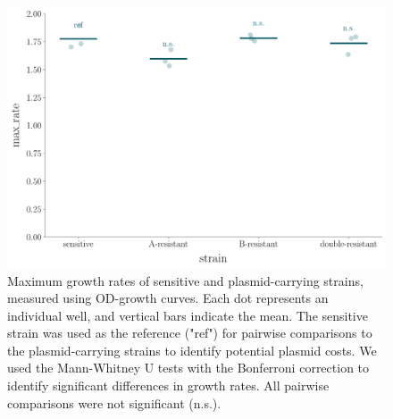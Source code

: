 \clearpage
\begin{figure}
    \centering
    \includegraphics[width=\linewidth]{supplementary_1/figures/plasmid_costs.pdf}
    \caption{
        Maximum growth rates of sensitive and plasmid-carrying strains, measured using OD-growth curves. 
        Each dot represents an individual well, and vertical bars indicate the mean. 
        The sensitive strain was used as the reference ("ref") for pairwise comparisons to the plasmid-carrying strains to identify potential plasmid costs. 
        We used the Mann-Whitney U tests with the Bonferroni correction to identify significant differences in growth rates. All pairwise comparisons were not significant (n.s.).
    }
    \label{fig:plasmid_costs}
\end{figure}

